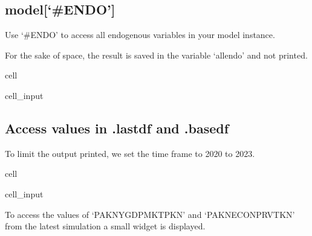 \documentclass[letterpaper,10pt,english]{jupyterBook}
\begin{document}
\subsection{model{[}‘\#ENDO’{]}}
\label{\detokenize{content/notebooks/modelflow_features:model-endo}}
\sphinxAtStartPar
Use ‘\#ENDO’ to access all endogenous variables in your model instance.

\sphinxAtStartPar
For the sake of space, the result is saved in the variable ‘allendo’ and not printed.

\begin{sphinxuseclass}{cell}\begin{sphinxVerbatimInput}

\begin{sphinxuseclass}{cell_input}
\begin{sphinxVerbatim}[commandchars=\\\{\}]
  \PYG{p}{[}\PYG{p}{]}
\end{sphinxVerbatim}

\end{sphinxuseclass}\end{sphinxVerbatimInput}

\end{sphinxuseclass}

\subsection{Access values in .lastdf and .basedf}
\label{\detokenize{content/notebooks/modelflow_features:access-values-in-lastdf-and-basedf}}
\sphinxAtStartPar
To limit the output printed, we set the time frame to 2020 to 2023.

\begin{sphinxuseclass}{cell}\begin{sphinxVerbatimInput}

\begin{sphinxuseclass}{cell_input}
\begin{sphinxVerbatim}[commandchars=\\\{\}]
\end{sphinxVerbatim}

\end{sphinxuseclass}\end{sphinxVerbatimInput}

\end{sphinxuseclass}
\sphinxAtStartPar
To access the values of ‘PAKNYGDPMKTPKN’ and ‘PAKNECONPRVTKN’ from the latest simulation a small widget is displayed.
\end{document}
